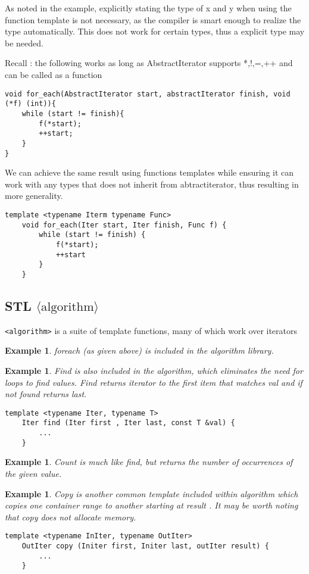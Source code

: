 \documentclass{article}
\newtheorem{ex}[theorem]{Example}
\begin{document}
As noted in the example, explicitly stating the type of x and y when using the function template is not necessary, as the compiler is smart enough to realize the type automatically. 
This does not work for certain types, thus a explicit type may be needed. 

Recall : the following works as long as AbstractIterator supports *,!,=,++ and can be called as a function
\begin{lstlisting}
void for_each(AbstractIterator start, abstractIterator finish, void (*f) (int)){
	while (start != finish){
		f(*start);
		++start; 
	}
}
\end{lstlisting}

We can achieve the same result using functions templates while ensuring it can work with any types that does not inherit from abtractiterator, thus resulting in more generality. 

\begin{lstlisting}
template <typename Iterm typename Func> 
	void for_each(Iter start, Iter finish, Func f) {
		while (start != finish) {
			f(*start);
			++start
		}
	}
\end{lstlisting}

\subsection{STL \(\langle \text{algorithm} \rangle\)}

\verb|<algorithm>| is a suite of template functions, many of which work over iterators

\begin{ex} foreach (as given above) is included in the algorithm library. \end{ex}
\begin{ex} Find is also included in the algorithm, which eliminates the need for loops to find values. Find returns iterator to the first item that matches val and if not found returns last.
\begin{lstlisting}
template <typename Iter, typename T> 
	Iter find (Iter first , Iter last, const T &val) {
		...
	}
\end{lstlisting}
\end{ex}

\begin{ex} Count is much like find, but returns the number of occurrences of the given value.
\end{ex}

\begin{ex} Copy is another common template included within algorithm which copies one container range to another starting at result . It may be worth noting that copy does not allocate memory. 
\begin{lstlisting}
template <typename InIter, typename OutIter>
	OutIter copy (Initer first, Initer last, outIter result) {
		...
	}
\end{lstlisting}
\end{ex}
\end{document}
